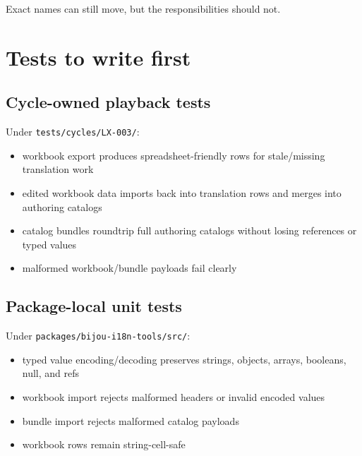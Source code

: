 Exact names can still move, but the responsibilities should not.

\section{Tests to write first}\label{record-190-tests-to-write-first}

\subsection{Cycle-owned playback tests}\label{record-190-cycle-owned-playback-tests}

Under \texttt{t\allowbreak{}e\allowbreak{}s\allowbreak{}t\allowbreak{}s\allowbreak{}/\allowbreak{}c\allowbreak{}y\allowbreak{}c\allowbreak{}l\allowbreak{}e\allowbreak{}s\allowbreak{}/\allowbreak{}L\allowbreak{}X\allowbreak{}-\allowbreak{}0\allowbreak{}0\allowbreak{}3\allowbreak{}/}:

\begin{itemize}
\tightlist
\item
  workbook export produces spreadsheet-friendly rows for stale/missing translation work
\item
  edited workbook data imports back into translation rows and merges into authoring catalogs
\item
  catalog bundles roundtrip full authoring catalogs without losing references or typed values
\item
  malformed workbook/bundle payloads fail clearly
\end{itemize}

\subsection{Package-local unit tests}\label{record-190-package-local-unit-tests}

Under \texttt{p\allowbreak{}a\allowbreak{}c\allowbreak{}k\allowbreak{}a\allowbreak{}g\allowbreak{}e\allowbreak{}s\allowbreak{}/\allowbreak{}b\allowbreak{}i\allowbreak{}j\allowbreak{}o\allowbreak{}u\allowbreak{}-\allowbreak{}i\allowbreak{}1\allowbreak{}8\allowbreak{}n\allowbreak{}-\allowbreak{}t\allowbreak{}o\allowbreak{}o\allowbreak{}l\allowbreak{}s\allowbreak{}/\allowbreak{}s\allowbreak{}r\allowbreak{}c\allowbreak{}/}:

\begin{itemize}
\tightlist
\item
  typed value encoding/decoding preserves strings, objects, arrays, booleans, null, and refs
\item
  workbook import rejects malformed headers or invalid encoded values
\item
  bundle import rejects malformed catalog payloads
\item
  workbook rows remain string-cell-safe
\end{itemize}

